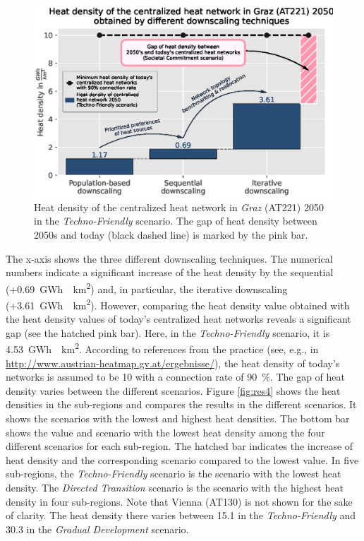 \begin{figure}[h]
	\centering
	\includegraphics[width=1\linewidth]{figures/4_Results/Fig_Heat-density/HD_cleaned1.eps}
	\caption{Heat density of the centralized heat network in \textit{Graz} (AT221) 2050 in the \textit{Techno-Friendly} scenario. The gap of heat density between 2050s and today (black dashed line) is marked by the pink bar.}
	\label{fig:res5}
\end{figure}

The x-axis shows the three different downscaling techniques. The numerical numbers indicate a significant increase of the heat density by the sequential (+\SI{0.69}{GWh \per km^2}) and, in particular, the iterative downscaling (+\SI{3.61}{GWh \per km^2}). However, comparing the heat density value obtained with the heat density values of today's centralized heat networks reveals a significant gap (see the hatched pink bar). Here, in the \textit{Techno-Friendly} scenario, it is \SI{4.53}{GWh \per km^2}. According to references from the practice (see, e.g., in \url{http://www.austrian-heatmap.gv.at/ergebnisse/}), the heat density of today's networks is assumed to be \SI{10}{} with a connection rate of \SI{90}{\%}. The gap of heat density varies between the different scenarios. Figure \ref{fig:res4} shows the heat densities in the sub-regions and compares the results in the different scenarios. It shows the scenarios with the lowest and highest heat densities. The bottom bar shows the value and scenario with the lowest heat density among the four different scenarios for each sub-region. The hatched bar indicates the increase of heat density and the corresponding scenario compared to the lowest value. In five sub-regions, the \textit{Techno-Friendly} scenario is the scenario with the lowest heat density. The \textit{Directed Transition} scenario is the scenario with the highest heat density in four sub-regions. Note that Vienna (AT130) is not shown for the sake of clarity. The heat density there varies between \SI{15.1}{} in the \textit{Techno-Friendly} and \SI{30.3}{} in the \textit{Gradual Development} scenario.
 
